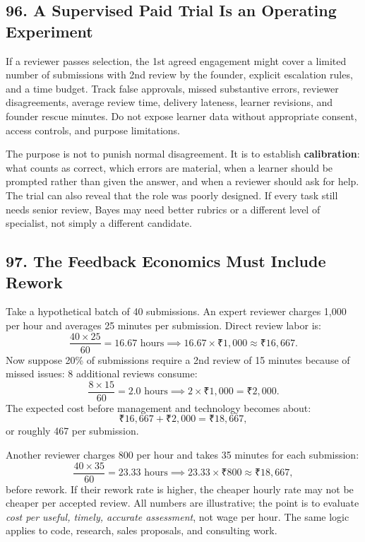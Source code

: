 \subsection*{96. A Supervised Paid Trial Is an Operating Experiment}

If a reviewer passes selection, the 1st agreed engagement might cover a limited number of submissions with 2nd review by the founder, explicit escalation rules, and a time budget. Track false approvals, missed substantive errors, reviewer disagreements, average review time, delivery lateness, learner revisions, and founder rescue minutes. Do not expose learner data without appropriate consent, access controls, and purpose limitations.

The purpose is not to punish normal disagreement. It is to establish \textbf{calibration}: what counts as correct, which errors are material, when a learner should be prompted rather than given the answer, and when a reviewer should ask for help. The trial can also reveal that the role was poorly designed. If every task still needs senior review, Bayes may need better rubrics or a different level of specialist, not simply a different candidate.

\subsection*{97. The Feedback Economics Must Include Rework}

Take a hypothetical batch of 40 submissions. An expert reviewer charges 1,000 per hour and averages 25 minutes per submission. Direct review labor is:
\begin{equation}
\frac{40 \times 25}{60} = 16.67\text{ hours} \implies 16.67 \times \text{₹}1,000 \approx \text{₹}16,667.
\end{equation}
Now suppose 20\% of submissions require a 2nd review of 15 minutes because of missed issues: 8 additional reviews consume:
\begin{equation}
\frac{8 \times 15}{60} = 2.0\text{ hours} \implies 2 \times \text{₹}1,000 = \text{₹}2,000.
\end{equation}
The expected cost before management and technology becomes about:
\begin{equation}
\text{₹}16,667 + \text{₹}2,000 = \text{₹}18,667,
\end{equation}
or roughly 467 per submission.

Another reviewer charges 800 per hour and takes 35 minutes for each submission:
\begin{equation}
\frac{40 \times 35}{60} = 23.33\text{ hours} \implies 23.33 \times \text{₹}800 \approx \text{₹}18,667,
\end{equation}
before rework. If their rework rate is higher, the cheaper hourly rate may not be cheaper per accepted review. All numbers are illustrative; the point is to evaluate \textit{cost per useful, timely, accurate assessment}, not wage per hour. The same logic applies to code, research, sales proposals, and consulting work.

